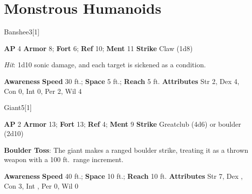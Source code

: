 \section{Monstrous Humanoids}
\begin{monsection}{Banshee}{3}[1]
\vspace{-1em}\vspace{-1em}
\begin{spellcontent}
\begin{spelltargetinginfo}
{\textbf{AP} 4}
\pari \textbf{Armor} 8;
\textbf{Fort} 6;
\textbf{Ref} 10;
\textbf{Ment} 11
\pari \textbf{Strike} Claw  (1d8)
\end{spelltargetinginfo}
\begin{spelleffects}
\pari
{}
\par
\par \textit{Hit}: 1d10 sonic damage, and each target is sickened as a condition.
\end{spelleffects}
\end{spellcontent}
\begin{spellsubcontent}
\begin{spellfooter}
\pari \textbf{Awareness} 
\pari \textbf{Speed} 30 ft.;
\textbf{Space} 5 ft.;
\textbf{Reach} 5 ft.
\pari \textbf{Attributes}
Str 2,
Dex 4,
Con 0,
Int 0,
Per 2,
Wil 4
\end{spellfooter}
\end{spellsubcontent}
\end{monsection}
\begin{monsection}[Hill]{Giant}{5}[1]
\vspace{-1em}\vspace{-1em}
\begin{spellcontent}
\begin{spelltargetinginfo}
{\textbf{AP} 2}
\pari \textbf{Armor} 13;
\textbf{Fort} 13;
\textbf{Ref} 4;
\textbf{Ment} 9
\pari \textbf{Strike} Greatclub  (4d6) or boulder  (2d10)
\end{spelltargetinginfo}
\begin{spelleffects}
\pari
\textbf{Boulder Toss}:
The giant makes a ranged boulder strike, treating it as a thrown weapon with a 100 ft.\ range increment.
\end{spelleffects}
\end{spellcontent}
\begin{spellsubcontent}
\begin{spellfooter}
\pari \textbf{Awareness} 
\pari \textbf{Speed} 40 ft.;
\textbf{Space} 10 ft.;
\textbf{Reach} 10 ft.
\pari \textbf{Attributes}
Str 7,
Dex ,
Con 3,
Int ,
Per 0,
Wil 0
\end{spellfooter}
\end{spellsubcontent}
\end{monsection}
